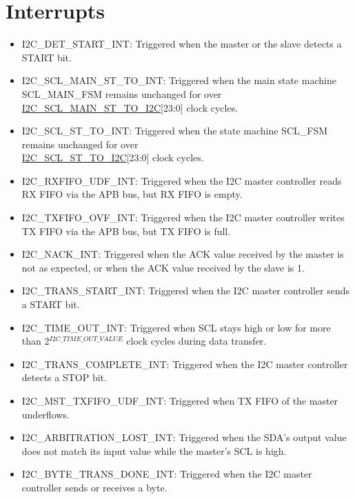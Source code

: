 \documentclass[main\_\_EN.tex]{subfiles}
\begin{document}
\section{Interrupts}\label{sub:i2c-int}
\begin{itemize}
\item \label{int:i2c-start}I2C\_DET\_START\_INT: Triggered when the master or the slave detects a START bit.
\item \label{int:i2c-scl-main-fsm}I2C\_SCL\_MAIN\_ST\_TO\_INT: Triggered when the main state machine SCL\_MAIN\_FSM remains unchanged for over \hyperref[fielddesc:I2CSCLMAINSTTOI2C]{I2C\_SCL\_MAIN\_ST\_TO\_I2C}[23:0] clock cycles.
\item \label{int:i2c-scl-fsm}I2C\_SCL\_ST\_TO\_INT: Triggered when the state machine SCL\_FSM remains unchanged for over \\\hyperref[fielddesc:I2CSCLSTTOI2C]{I2C\_SCL\_ST\_TO\_I2C}[23:0] clock cycles.
\item \label{int:i2c-rxfifo-udf}I2C\_RXFIFO\_UDF\_INT: Triggered when the I2C master controller reads RX FIFO via the APB bus, but RX FIFO is empty.
\item \label{int:i2c-txfifo-ovf}I2C\_TXFIFO\_OVF\_INT: Triggered when the I2C master controller writes TX FIFO via the APB bus, but TX FIFO is full.
\item \label{int:i2c-nack}I2C\_NACK\_INT: Triggered when the ACK value received by the master is not as expected, or when the ACK value received by the slave is 1.
\item \label{int:i2c-trans-start}I2C\_TRANS\_START\_INT: Triggered when the I2C master controller sends a START bit.
\item \label{int:i2c-time-out}I2C\_TIME\_OUT\_INT: Triggered when SCL stays high or low for more than 2$^{\hyperref[fielddesc:I2CTIMEOUTVALUE]{I2C\_TIME\_OUT\_VALUE}}$ clock cycles during data transfer.
\item \label{int:i2c-trans-complete}I2C\_TRANS\_COMPLETE\_INT: Triggered when the I2C master controller detects a STOP bit.
\item \label{int:i2c-mst-txfifo-udf}I2C\_MST\_TXFIFO\_UDF\_INT: Triggered when TX FIFO of the master underflows.
\item \label{int:i2c-arbitration-lost}I2C\_ARBITRATION\_LOST\_INT: Triggered when the SDA's output value does not match its input value while the master's SCL is high.
\item \label{int:i2c-byte-trans-done}I2C\_BYTE\_TRANS\_DONE\_INT: Triggered when the I2C master controller sends or receives a byte.

\end{itemize}
\end{document}
